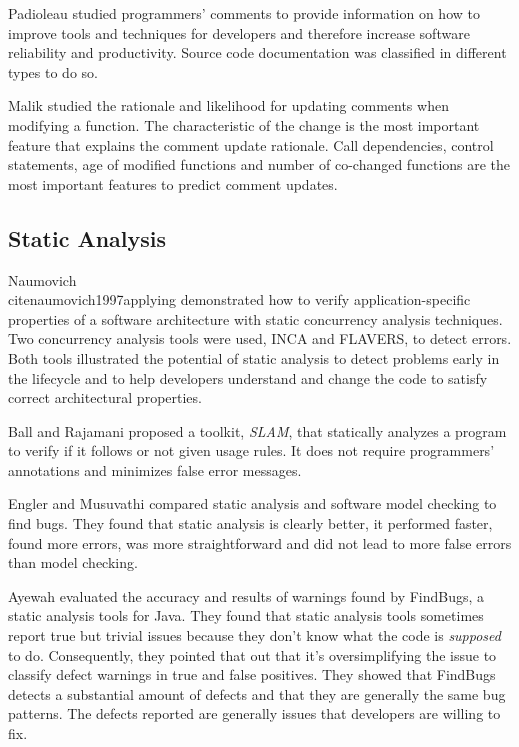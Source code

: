 Padioleau \etal \cite{padioleau2009listening} studied programmers' comments to provide information on how to improve tools and techniques for developers and therefore increase software reliability and productivity. Source code documentation was classified in different types to do so.

Malik \etal \cite{malik2008understanding} studied the rationale and likelihood for updating comments when modifying a function. The characteristic of the change is the most important feature that explains the comment update rationale. Call dependencies, control statements, age of modified functions and number of co-changed functions are the most important features to predict comment updates.

\subsection{Static Analysis}
Naumovich \etal \\cite{naumovich1997applying} demonstrated how to verify application-specific properties of a software architecture with static concurrency analysis techniques. Two concurrency analysis tools were used, INCA and FLAVERS, to detect errors. Both tools illustrated the potential of static analysis to detect problems early in the lifecycle and to help developers understand and change the code to satisfy correct architectural properties.

Ball and Rajamani \cite{ball2002s} proposed a toolkit, \textit{SLAM}, that statically analyzes a program to verify if it follows or not given usage rules. It does not require programmers' annotations and minimizes false error messages.

Engler and Musuvathi \cite{engler2004static} compared static analysis and software model checking to find bugs. They found that static analysis is clearly better, it performed faster, found more errors, was more straightforward and did not lead to more false errors than model checking.

Ayewah \etal \cite{ayewah2007evaluating} evaluated the accuracy and results of warnings found by FindBugs, a static analysis tools for Java. They found that static analysis tools sometimes report true but trivial issues because they don't know what the code is \textit{supposed} to do. Consequently, they pointed that out that it's oversimplifying the issue to classify defect warnings in true and false positives. They showed that FindBugs detects a substantial amount of defects and that they are generally the same bug patterns. The defects reported are generally issues that developers are willing to fix.

